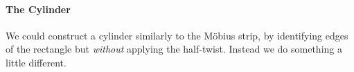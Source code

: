 
\paragraph{The Cylinder}\label{page:cylinder}

We could construct a cylinder similarly to the Möbius strip, by identifying edges of the rectangle but \emph{without} applying the half-twist. Instead we do something a little different.\\

